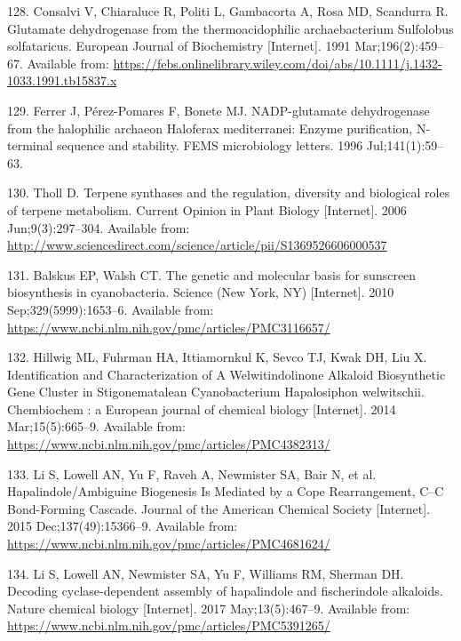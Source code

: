 \documentclass[12pt,twoside]{reedthesis}
\begin{document}
  \hypertarget{ref-consalvi_glutamate_1991}{}
  128. Consalvi V, Chiaraluce R, Politi L, Gambacorta A, Rosa MD,
  Scandurra R. Glutamate dehydrogenase from the thermoacidophilic
  archaebacterium Sulfolobus solfataricus. European Journal of
  Biochemistry {[}Internet{]}. 1991 Mar;196(2):459--67. Available from:
  \url{https://febs.onlinelibrary.wiley.com/doi/abs/10.1111/j.1432-1033.1991.tb15837.x}
  
  \hypertarget{ref-ferrer_nadp-glutamate_1996}{}
  129. Ferrer J, Pérez-Pomares F, Bonete MJ. NADP-glutamate dehydrogenase
  from the halophilic archaeon Haloferax mediterranei: Enzyme
  purification, N-terminal sequence and stability. FEMS microbiology
  letters. 1996 Jul;141(1):59--63.
  
  \hypertarget{ref-tholl_terpene_2006}{}
  130. Tholl D. Terpene synthases and the regulation, diversity and
  biological roles of terpene metabolism. Current Opinion in Plant Biology
  {[}Internet{]}. 2006 Jun;9(3):297--304. Available from:
  \url{http://www.sciencedirect.com/science/article/pii/S1369526606000537}
  
  \hypertarget{ref-balskus_genetic_2010}{}
  131. Balskus EP, Walsh CT. The genetic and molecular basis for sunscreen
  biosynthesis in cyanobacteria. Science (New York, NY) {[}Internet{]}.
  2010 Sep;329(5999):1653--6. Available from:
  \url{https://www.ncbi.nlm.nih.gov/pmc/articles/PMC3116657/}
  
  \hypertarget{ref-hillwig_identification_2014}{}
  132. Hillwig ML, Fuhrman HA, Ittiamornkul K, Sevco TJ, Kwak DH, Liu X.
  Identification and Characterization of A Welwitindolinone Alkaloid
  Biosynthetic Gene Cluster in Stigonematalean Cyanobacterium Hapalosiphon
  welwitschii. Chembiochem : a European journal of chemical biology
  {[}Internet{]}. 2014 Mar;15(5):665--9. Available from:
  \url{https://www.ncbi.nlm.nih.gov/pmc/articles/PMC4382313/}
  
  \hypertarget{ref-li_hapalindole_ambiguine_2015}{}
  133. Li S, Lowell AN, Yu F, Raveh A, Newmister SA, Bair N, et al.
  Hapalindole/Ambiguine Biogenesis Is Mediated by a Cope Rearrangement,
  C--C Bond-Forming Cascade. Journal of the American Chemical Society
  {[}Internet{]}. 2015 Dec;137(49):15366--9. Available from:
  \url{https://www.ncbi.nlm.nih.gov/pmc/articles/PMC4681624/}
  
  \hypertarget{ref-li_decoding_2017}{}
  134. Li S, Lowell AN, Newmister SA, Yu F, Williams RM, Sherman DH.
  Decoding cyclase-dependent assembly of hapalindole and fischerindole
  alkaloids. Nature chemical biology {[}Internet{]}. 2017
  May;13(5):467--9. Available from:
  \url{https://www.ncbi.nlm.nih.gov/pmc/articles/PMC5391265/}
  
\end{document}
